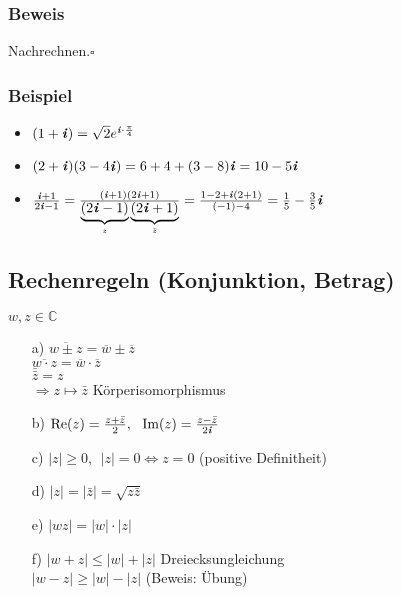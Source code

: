 \documentclass[a4paper, 12pt,titlepage, pdf, headsepline]{article}
\newcommand{\C}{\mathds{C}}
\newcommand{\qed}{\hfill$\square$}
\renewcommand{\Re}[1]{\text{Re}(#1)}
\renewcommand{\Im}[1]{\text{Im}(#1)}
\renewcommand{\i}{\textbf{\textit{i}}}
\renewcommand{\>}{\rightarrow}
\renewcommand{\*}{\cdot}
\begin{document}
		      			\subsubsection*{Beweis} Nachrechnen.\qed
		      			\subsubsection*{Beispiel}
		      			\begin{itemize}
		      				\item $(1+\i) = \sqrt{2} e^{\i\*\frac{\pi}{4}}$
		      				\item $(2+\i)(3-4\i) = 6 +4 + (3-8)\i = 10 -5\i$
                                                \item $\frac{\i+1}{2\i -1} = \frac{(\i+1)(2\i+1)}{\underbrace{(2\i-1)}_{z}\underbrace{(2\i+1)}_{\bar{z}}} =\frac{1-2 +\i(2+1)}{(-1) - 4} = \frac{1}{5} - \frac{3}{5}\i$
		      			\end{itemize}
		      			\subsection{Rechenregeln (Konjunktion, Betrag)}
		      			\label{5.11}
		      			$w,z \in \C$
		      			\begin{itemize}
		      				\item[a)] $\overline{w \pm z} = \overline{w} \pm \overline{z}$\\
		      				      $\overline{w \cdot z} = \overline{w} \cdot \overline{z}$\\
		      				      $\bar{\bar{z}} = z$\\
		      				      $\Rightarrow z \mapsto \bar{z}$ Körperisomorphismus
		      				\item[b)] $\Re{z} =  \frac{z + \bar{z}}{2},~~ \Im{z} = \frac{z - \bar{z}}{2\i}$
		      				\item[c)] $|z| \geq 0,~~ |z| = 0 \Leftrightarrow z = 0$ (positive Definitheit)
		      				\item[d)] $|z| = |\bar{z}| = \sqrt{z\bar{z}}$
		      				\item[e)] $|wz| = |w| \cdot |z|$
		      				\item[f)] $|w+z| \leq |w| + |z|$ Dreiecksungleichung \\
		      				      $|w-z| \geq |w| - |z|$ (Beweis: Übung)
		      			\end{itemize}
\end{document}
